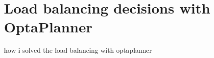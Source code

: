 \section{Load balancing decisions with OptaPlanner}\label{sec:load-balancing-optaplanner}
how i solved the load balancing with optaplanner